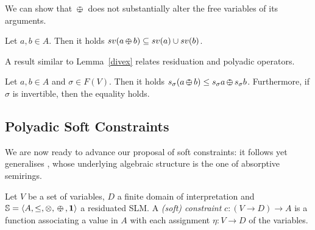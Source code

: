 \documentclass{llncs}
\def\monid{{\mathbf 0}}
\def\monop{\otimes}
\def\odiv{\, {\ominus\hspace{-7.7pt} \div} \,}
\def\monid{\mathbf{1}}
\begin{document}
We can show that $\odiv$ does not substantially alter the free variables of its arguments.

\begin{lemma}
Let $a, b \in A$. Then it holds $sv(a \odiv b) \subseteq sv(a) \cup sv(b)$. 
\end{lemma}



%

A result similar to Lemma~\ref{divex} relates residuation and polyadic operators.


\begin{lemma}
Let $a, b \in A$ and $\sigma \in F(V)$. Then it holds
$s_\sigma (a \odiv b) \leq s_\sigma a \odiv s_\sigma b$.
Furthermore, if $\sigma$ is invertible, then the equality holds.
\end{lemma}


\subsection{Polyadic Soft Constraints}\label{sec:softconstraints}
\label{subsec:inst} 
We are now ready to advance our proposal of soft constraints: it follows yet generalises \cite{scc},
whose underlying algebraic structure is the one of absorptive semirings.

\begin{definition}\label{def:softconstraints}
	Let $V$ be a set of variables, $D$ a finite domain of interpretation
	and ${\mathbb S} = \langle A, \leq, \monop, \odiv, \monid \rangle$ a residuated SLM.
	A \emph{(soft) constraint} $c: (V \rightarrow D) \rightarrow
	A$ is a function associating a value in $A$ with each assignment
	$\eta: V\rightarrow D$ of the variables.
\end{definition}
\end{document}
